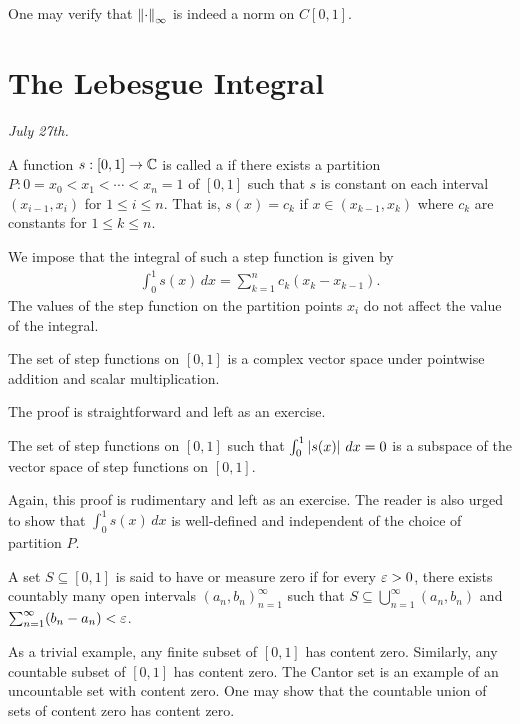 One may verify that $\left\lVert\cdot\right\rVert_{\infty}$ is indeed a norm on $C[0,1]$.

\section{The Lebesgue Integral}
\textit{July 27th.}

\begin{definition}
    A function $s:[0,1] \to \mathbb{C}$ is called a  if there exists a partition $P:0=x_{0} < x_{1} < \cdots < x_{n}=1$ of $[0,1]$ such that $s$ is constant on each interval $(x_{i-1},x_{i})$ for $1 \leq i \leq n$. That is, $s(x) = c_{k}$ if $x \in (x_{k-1},x_{k})$ where $c_{k}$ are constants for $1 \leq k \leq n$.
\end{definition}

We impose that the integral of such a step function is given by
\begin{align}
    \int_{0}^{1} s(x) \, dx = \sum_{k=1}^{n} c_{k}(x_{k}-x_{k-1}).
\end{align}
The values of the step function on the partition points $x_{i}$ do not affect the value of the integral.

\begin{proposition}
    The set of step functions on $[0,1]$ is a complex vector space under pointwise addition and scalar multiplication.
\end{proposition}
The proof is straightforward and left as an exercise. 

\begin{proposition}
    The set of step functions on $[0,1]$ such that $\int_{0}^{1} \left| s(x) \right| \, dx = 0$ is a subspace of the vector space of step functions on $[0,1]$.
\end{proposition}
Again, this proof is rudimentary and left as an exercise. The reader is also urged to show that $\int_{0}^{1} s(x) \, dx$ is well-defined and independent of the choice of partition $P$.

\begin{definition}
    A set $S \subseteq [0,1]$ is said to have  or measure zero if for every $\varepsilon > 0$, there exists countably many open intervals $(a_{n},b_{n})_{n=1}^{\infty}$ such that $S \subseteq \bigcup_{n=1}^{\infty} (a_{n},b_{n})$ and $\sum_{n=1}^{\infty} (b_{n}-a_{n}) < \varepsilon$.
\end{definition}

As a trivial example, any finite subset of $[0,1]$ has content zero. Similarly, any countable subset of $[0,1]$ has content zero. The Cantor set is an example of an uncountable set with content zero. One may show that the countable union of sets of content zero has content zero.

